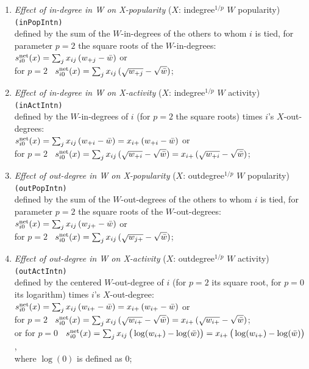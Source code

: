 \documentclass[a4paper,fleqn,11pt]{article}
\newcommand{\+}{\, + \,}
\newcommand{\vit}{\theenumi}
\newcounter{savenumi}
\begin{document}
\begin{enumerate}
\setcounter{enumi}{\value{savenumi}}
 \item {\em Effect of in-degree in W on X-popularity } ($X$: indegree$^{1/p}$ $W$ popularity)   \texttt{(inPopIntn)}\\
 defined by   the sum of  the $W$-in-degrees of the others to whom $i$ is tied,
 for parameter $p = 2$ the square roots of the $W$-in-degrees:\\
 $s^{\rm net}_{i\vit}(x) =  \sum_j x_{ij}\, ({w_{+j}} - {\bar w})  $ or\\
for $p=2$ \  $s^{\rm net}_{i\vit}(x) =  \sum_j x_{ij}\, (\sqrt{w_{+j}} - \sqrt{\bar w})  $;\\

 \item {\em Effect of in-degree in W on X-activity } ($X$: indegree$^{1/p}$ $W$ activity)  \texttt{(inActIntn)}\\
 defined by the $W$-in-degrees of $i$ (for $p = 2$ the square roots)
 times $i$'s $X$-out-degrees:\\[0.2em]
 $s^{\rm net}_{i\vit}(x) =  \sum_j x_{ij}\, ({w_{+i}} - {\bar w})
                 =  x_{i+}\, ({w_{+i}} - {\bar w}) $ or\\[0.2em]
for $p=2$ \  $s^{\rm net}_{i\vit}(x) =  \sum_j x_{ij}\, (\sqrt{w_{+i}} - \sqrt{\bar w})
                 =  x_{i+}\, (\sqrt{w_{+i}} - \sqrt{\bar w}) $;\\[0.2em]

 \item {\em Effect of out-degree in W on X-popularity } ($X$: outdegree$^{1/p}$ $W$ popularity) \texttt{(outPopIntn)}\\
 defined by   the sum of  the $W$-out-degrees of the others to whom $i$ is tied,
 for parameter $p = 2$ the square roots of the $W$-out-degrees:\\[0.2em]
 $s^{\rm net}_{i\vit}(x) =  \sum_j x_{ij}\, ({w_{j+}} - {\bar w})$ or\\[0.2em]
for $p=2$ \  $s^{\rm net}_{i\vit}(x) =  \sum_j x_{ij}\, (\sqrt{w_{j+}} - \sqrt{\bar w})$;\\[0.2em]

 \item {\em Effect of out-degree  in W on X-activity } ($X$: outdegree$^{1/p}$ $W$ activity) \texttt{(outActIntn)}\\
 defined by the centered $W$-out-degree of $i$ (for $p = 2$ its square root, for $p=0$ its logarithm)
 times $i$'s $X$-out-degree:\\[0.3em]
 $s^{\rm net}_{i\vit}(x) =  \sum_j x_{ij}\, ({w_{i+}} - {\bar w}) =
                           x_{i+}\, ({w_{i+}} - {\bar w}) $ or\\[0.2em]
for $p=2$ \  $s^{\rm net}_{i\vit}(x) =  \sum_j x_{ij}\, (\sqrt{w_{i+}} - \sqrt{\bar w}) =
                           x_{i+}\, (\sqrt{w_{i+}} - \sqrt{\bar w}) $;\\[0.3em]
or for $p=0 $ \  $s^{\rm net}_{i\vit}(x) =  \sum_j x_{ij}\, \big(\log(w_{i+}) - \log(\bar w)\big) =
                           x_{i+}\, \big(\log(w_{i+}) - \log(\bar w)\big) $,\\[0.3em]
where $\log(0)$ is defined as 0;

\setcounter{savenumi}{\value{enumi}}
\end{enumerate}
\end{document}
